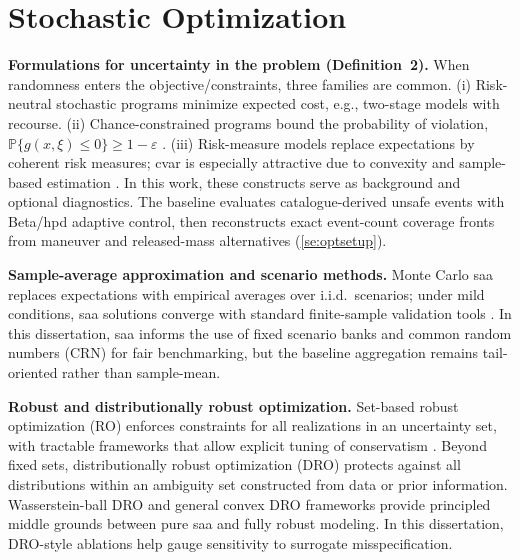     \section{Stochastic Optimization} \label{se:stochasticoptim}
    
    \textbf{Formulations for uncertainty in the problem (Definition~2).}
    When randomness enters the objective/constraints, three families are common. 
    (i) Risk-neutral stochastic programs minimize expected cost, e.g., two-stage models with recourse. 
    (ii) Chance-constrained programs bound the probability of violation, $\mathbb{P}\{g(x,\xi)\le 0\}\!\ge\!1-\varepsilon$ \cite{LaguelMalickVanAckooij2021,charnes1959chance}. 
    (iii) Risk-measure models replace expectations by coherent risk measures; \gls{cvar} is especially attractive due to convexity and sample-based estimation \cite{rockafellar2000cvar}. 
    In this work, these constructs serve as background and optional diagnostics. The baseline evaluates catalogue-derived unsafe events with Beta/\gls{hpd} adaptive control, then reconstructs exact event-count coverage fronts from maneuver and released-mass alternatives (\cref{se:optsetup}).
    
    \textbf{Sample-average approximation and scenario methods.}
    Monte Carlo \gls{saa} replaces expectations with empirical averages over i.i.d.\ scenarios; under mild conditions, \gls{saa} solutions converge with standard finite-sample validation tools \cite{AhmedShapiro2002SAA}. In this dissertation, \gls{saa} informs the use of fixed scenario banks and common random numbers (CRN) for fair benchmarking, but the baseline aggregation remains tail-oriented rather than sample-mean.
    
    \textbf{Robust and distributionally robust optimization.}
    Set-based robust optimization (RO) enforces constraints for all realizations in an uncertainty set, with tractable frameworks that allow explicit tuning of conservatism \cite{BertsimasSim2004,BeyerSendhoff2007}. Beyond fixed sets, distributionally robust optimization (DRO) protects against all distributions within an ambiguity set constructed from data or prior information. Wasserstein-ball DRO \cite{EsfahaniKuhn2018} and general convex DRO frameworks \cite{WiesemannKuhnSim2014} provide principled middle grounds between pure \gls{saa} and fully robust modeling. In this dissertation, DRO-style ablations help gauge sensitivity to surrogate misspecification.
    

